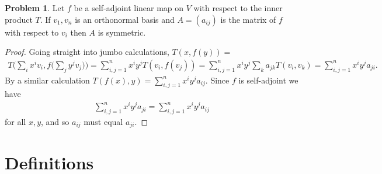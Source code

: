 \documentclass[20pt]{article}
\theoremstyle{plain}
\theoremstyle{definition}
\newtheorem*{problem}{Problem}
\begin{document}
\begin{problem}{4.11}
  Let $f$ be a self-adjoint linear map on $V$ with respect to the inner product
  $T$.  If $v_1, v_n$ is an orthonormal basis and $A = (a_{ij})$ is the matrix of 
  $f$ with respect to $v_i$ then $A$ is symmetric.
\end{problem}
\begin{proof}
  Going straight into jumbo calculations, $T(x, f(y)) = $
  \begin{align*}
    T \bigg( \sum_i x^iv_i, f \bigg( \sum_j y^jv_j  \bigg) \bigg) =
    \sum_{i,j = 1}^n x^iy^jT(v_i, f(v_j)) =
    \sum_{i,j = 1}^n x^iy^j \sum_k a_{jk} T(v_i, v_k) =
    \sum_{i,j = 1}^n x^iy^ja_{ji}.
  \end{align*}
  By a similar calculation $T(f(x), y) = \sum_{i,j = 1}^n x^iy^ja_{ij}$.
  Since $f$ is self-adjoint we have 
  \begin{align*}
    \sum_{i,j = 1}^n x^iy^ja_{ji} = \sum_{i,j = 1}^n x^iy^ja_{ij}
  \end{align*}
  for all $x, y$, and so $a_{ij}$ must equal $a_{ji}.$
\end{proof}
































\break



\section{Definitions}
\end{document}
